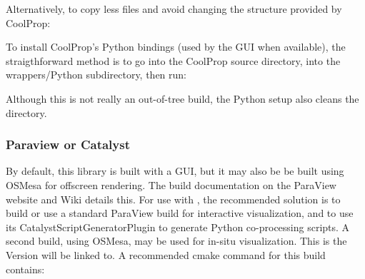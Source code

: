 \documentclass[a4paper,10pt,twoside]{csshortdoc}
\begin{document}
Alternatively, to copy less files and avoid changing the structure provided
by CoolProp:


\sloppy

To install CoolProp's Python bindings (used by the GUI when available),
the straigthforward method is to go into the CoolProp source directory,
into the wrappers/Python subdirectory, then run:


Although this is not really an out-of-tree build, the Python
setup also cleans the directory.

\subsubsection{Paraview or Catalyst\label{sec:ext:catalyst}}

By default, this library is built with a GUI, but it may also be be
built using OSMesa for offscreen rendering. The build documentation
on the ParaView website and Wiki details this. For use with \CS,
the recommended solution is to build or use a standard ParaView build
for interactive visualization, and to use its CatalystScriptGeneratorPlugin
to generate Python co-processing scripts. A second build, using OSMesa,
may be used for in-situ visualization. This is the Version \CS will be linked
to. A recommended cmake command for this build contains:
\end{document}
